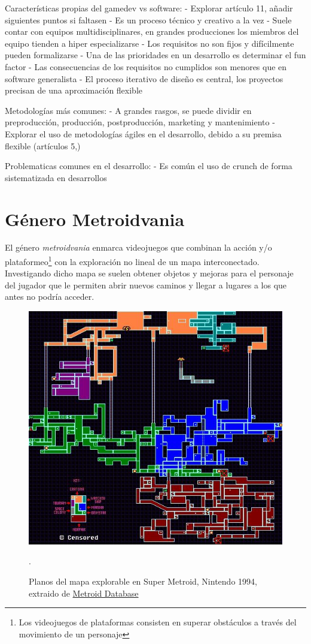 Características propias del gamedev vs software:
- Explorar artículo 11, añadir siguientes puntos si faltasen
- Es un proceso técnico y creativo a la vez
- Suele contar con equipos multidisciplinares, en grandes producciones los miembros del equipo tienden a hiper especializarse
- Los requisitos no son fijos y difícilmente pueden formalizarse
- Una de las prioridades en un desarrollo es determinar el fun factor
- Las consecuencias de los requisitos no cumplidos son menores que en software generalista
- El proceso iterativo de diseño es central, los proyectos precisan de una aproximación flexible

Metodologías más comunes:
- A grandes rasgos, se puede dividir en preproducción, producción, postproducción, marketing y mantenimiento
- Explorar el uso de metodologías ágiles en el desarrollo, debido a su premisa flexible (artículos 5,)

Problematicas comunes en el desarrollo:
- Es común el uso de crunch de forma sistematizada en desarrollos

\section{Género Metroidvania}

El género \textit{metroidvania} enmarca videojuegos que combinan la acción y/o plataformeo\footnote{Los videojuegos de plataformas consisten en superar obstáculos a través del movimiento de un personaje} con la exploración no lineal de un mapa interconectado. Investigando dicho mapa se suelen obtener objetos y mejoras para el personaje del jugador que le permiten abrir nuevos caminos y llegar a lugares a los que antes no podría acceder.

\begin{figure}[h]
    \centering
    \includegraphics[scale=2.0]{img/smetrmap.jpg}
    \caption[Planos del mapa explorable en Super Metroid]{Planos del mapa explorable en Super Metroid, Nintendo 1994, extraido de \href{https://metroiddatabase.com/maps/}{Metroid Database}}.
    \label{fig:supermetroidmap}
\end{figure}

